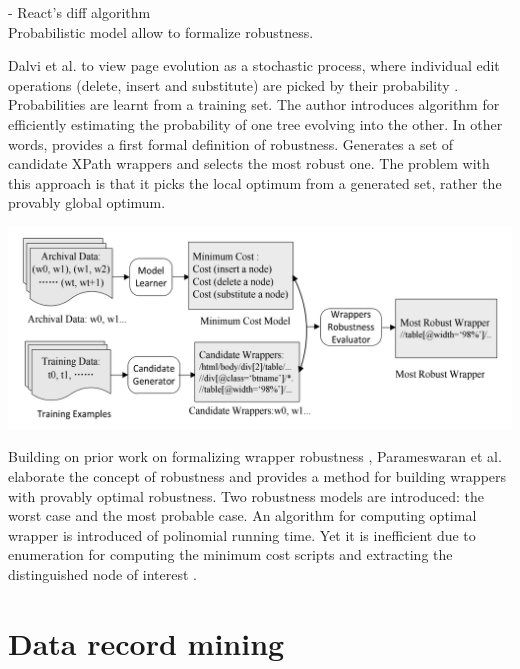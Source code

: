 - React’s diff algorithm\\

Probabilistic model allow to formalize robustness.

Dalvi et al. to view page evolution as a stochastic process, where individual edit operations (delete, insert and substitute) are picked by their probability \cite{dalvi2009a}. Probabilities are learnt from a training set. The author introduces algorithm for efficiently estimating the probability of one tree evolving into the other. In other words, provides a first formal definition of robustness. Generates a set of candidate XPath wrappers and selects the most robust one. The problem with this approach is that it picks the local optimum from a generated set, rather the provably global optimum.

\includegraphics[width=\linewidth]{figures/robust-web-extraction-framework}

Building on prior work on formalizing wrapper robustness \cite{dalvi2009a}, Parameswaran et al. \cite{DBLP:journals/pvldb/ParameswaranDGR11} elaborate the concept of robustness and provides a method for building wrappers with provably optimal robustness. Two robustness models are introduced: the worst case and the most probable case. An algorithm for computing optimal wrapper is introduced of polinomial running time. Yet it is inefficient due to enumeration for computing the minimum cost scripts and extracting the distinguished node of interest \cite{DBLP:conf/wism/LiuWYL12}.


\section{Data record mining}

